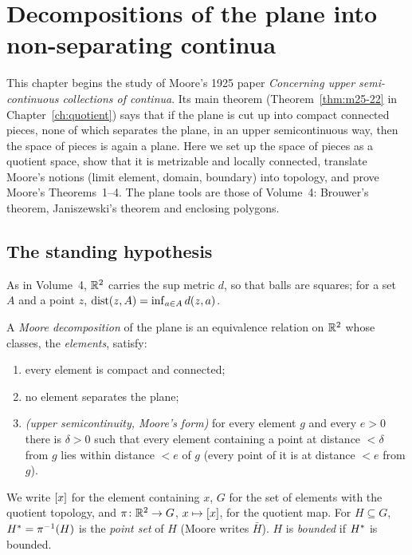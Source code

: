 \chapter{Decompositions of the plane into non-separating continua}\label{ch:usc}

This chapter begins the study of Moore's 1925 paper \emph{Concerning upper semi-continuous
collections of continua}. Its main theorem (Theorem~\ref{thm:m25-22} in Chapter~\ref{ch:quotient})
says that if the plane is cut up into compact connected pieces, none of which separates the plane,
in an upper semicontinuous way, then the space of pieces is again a plane. Here we set up the space
of pieces as a quotient space, show that it is metrizable and locally connected, translate Moore's
notions (limit element, domain, boundary) into topology, and prove Moore's Theorems~1--4. The
plane tools are those of Volume~4: Brouwer's theorem, Janiszewski's theorem and enclosing polygons.

\section{The standing hypothesis}

As in Volume~4, $\mathbb{R}^2$ carries the sup metric $d$, so that balls are squares; for a set $A$ and a
point $z$, $\operatorname{dist}(z,A)=\inf_{a\in A}d(z,a)$.

\begin{definition}\label{def:moore-decomp}
A \emph{Moore decomposition} of the plane is an equivalence relation on $\mathbb{R}^2$ whose classes, the
\emph{elements}, satisfy:
\begin{enumerate}[label=(\arabic*)]
\item every element is compact and connected;
\item no element separates the plane;
\item \emph{(upper semicontinuity, Moore's form)} for every element $g$ and every $e>0$ there is
$\delta>0$ such that every element containing a point at distance $<\delta$ from $g$ lies within
distance $<e$ of $g$ (every point of it is at distance $<e$ from $g$).
\end{enumerate}
We write $[x]$ for the element containing $x$, $G$ for the set of elements with the quotient
topology, and $\pi\colon\mathbb{R}^2\to G$, $x\mapsto[x]$, for the quotient map. For $H\subseteq G$,
$H^{\ast}=\pi^{-1}(H)$ is the \emph{point set} of $H$ (Moore writes $\bar H$). $H$ is \emph{bounded} if
$H^{\ast}$ is bounded.
\end{definition}

